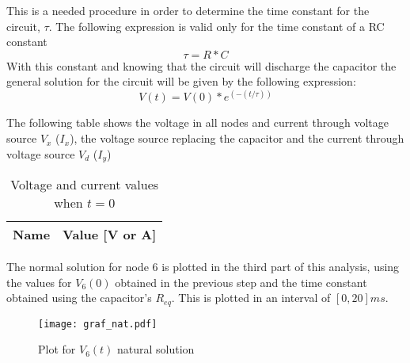 \vspace{20pt}
This is a needed procedure in order to determine the time constant for the circuit, $\tau$. The following expression is valid only for the time constant of a RC constant
\begin{equation}
\tau=R*C
\end{equation}
 With this constant and knowing that the circuit will discharge the capacitor the general solution for the circuit will be given by the following expression:
\begin{equation}
V(t)=V(0)*e^(-(t/\tau))
\end{equation}
\par
\par
The following table shows the voltage in all nodes and current through voltage source $V_x$ ($I_x$), the voltage source replacing the capacitor and the current through voltage source $V_d$ ($I_y$)
\par
\par
\begin{table}[H]
  \centering
  \begin{tabular}{|l|r|}
    \hline    
    {\bf Name} & {\bf Value [V or A]} \\ \hline
    
  \end{tabular}
  \caption{Voltage and current values when $t=0$}
  \label{tab:tcamp}
\end{table}
\vspace{20pt}
\par
\par
The normal solution for node 6 is plotted in the third part of this analysis, using the values for $V_6(0)$ obtained in the previous step and the time constant obtained using the capacitor's $R_{eq}$. This is plotted in an interval of $[0, 20]ms$.
\begin{figure}[H] \centering
\texttt{[image: graf\_nat.pdf]}
\caption{Plot for $V_6(t)$ natural solution}
\end{figure}

